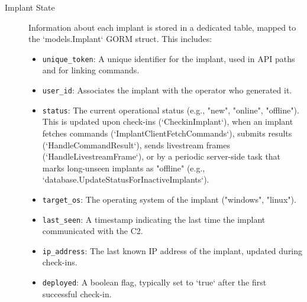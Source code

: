 \begin{description}
    \item[Implant State] Information about each implant is stored in a dedicated table, mapped to the `models.Implant` GORM struct. This includes:
        \begin{itemize}
            \item \texttt{unique\_token}: A unique identifier for the implant, used in API paths and for linking commands.
            \item \texttt{user\_id}: Associates the implant with the operator who generated it.
            \item \texttt{status}: The current operational status (e.g., "new", "online", "offline"). This is updated upon check-ins (`CheckinImplant`), when an implant fetches commands (`ImplantClientFetchCommands`), submits results (`HandleCommandResult`), sends livestream frames (`HandleLivestreamFrame`), or by a periodic server-side task that marks long-unseen implants as "offline" (e.g., `database.UpdateStatusForInactiveImplants`).
            \item \texttt{target\_os}: The operating system of the implant ("windows", "linux").
            \item \texttt{last\_seen}: A timestamp indicating the last time the implant communicated with the C2.
            \item \texttt{ip\_address}: The last known IP address of the implant, updated during check-ins.
            \item \texttt{deployed}: A boolean flag, typically set to `true` after the first successful check-in.
        \end{itemize}


\end{description}
